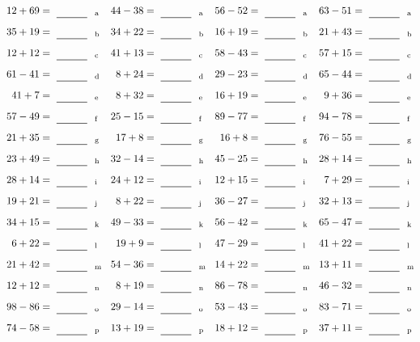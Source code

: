 \documentclass
[
  draft    = true,
  fontsize = 11pt,
  parskip  = half-
]
{scrartcl}
\begin{document}
\clearpage
\begin{align*}
    \pline{12+69}&=\rline{a}
  & \pline{44-38}&=\rline{a}
  & \pline{56-52}&=\rline{a}
  & \pline{63-51}&=\rline{a} \\[1ex]
    \pline{35+19}&=\rline{b}
  & \pline{34+22}&=\rline{b}
  & \pline{16+19}&=\rline{b}
  & \pline{21+43}&=\rline{b} \\[1ex]
    \pline{12+12}&=\rline{c}
  & \pline{41+13}&=\rline{c}
  & \pline{58-43}&=\rline{c}
  & \pline{57+15}&=\rline{c} \\[1ex]
    \pline{61-41}&=\rline{d}
  & \pline{8+24}&=\rline{d}
  & \pline{29-23}&=\rline{d}
  & \pline{65-44}&=\rline{d} \\[1ex]
    \pline{41+7}&=\rline{e}
  & \pline{8+32}&=\rline{e}
  & \pline{16+19}&=\rline{e}
  & \pline{9+36}&=\rline{e} \\[1ex]
    \pline{57-49}&=\rline{f}
  & \pline{25-15}&=\rline{f}
  & \pline{89-77}&=\rline{f}
  & \pline{94-78}&=\rline{f} \\[1ex]
    \pline{21+35}&=\rline{g}
  & \pline{17+8}&=\rline{g}
  & \pline{16+8}&=\rline{g}
  & \pline{76-55}&=\rline{g} \\[1ex]
    \pline{23+49}&=\rline{h}
  & \pline{32-14}&=\rline{h}
  & \pline{45-25}&=\rline{h}
  & \pline{28+14}&=\rline{h} \\[1ex]
    \pline{28+14}&=\rline{i}
  & \pline{24+12}&=\rline{i}
  & \pline{12+15}&=\rline{i}
  & \pline{7+29}&=\rline{i} \\[1ex]
    \pline{19+21}&=\rline{j}
  & \pline{8+22}&=\rline{j}
  & \pline{36-27}&=\rline{j}
  & \pline{32+13}&=\rline{j} \\[1ex]
    \pline{34+15}&=\rline{k}
  & \pline{49-33}&=\rline{k}
  & \pline{56-42}&=\rline{k}
  & \pline{65-47}&=\rline{k} \\[1ex]
    \pline{6+22}&=\rline{l}
  & \pline{19+9}&=\rline{l}
  & \pline{47-29}&=\rline{l}
  & \pline{41+22}&=\rline{l} \\[1ex]
    \pline{21+42}&=\rline{m}
  & \pline{54-36}&=\rline{m}
  & \pline{14+22}&=\rline{m}
  & \pline{13+11}&=\rline{m} \\[1ex]
    \pline{12+12}&=\rline{n}
  & \pline{8+19}&=\rline{n}
  & \pline{86-78}&=\rline{n}
  & \pline{46-32}&=\rline{n} \\[1ex]
    \pline{98-86}&=\rline{o}
  & \pline{29-14}&=\rline{o}
  & \pline{53-43}&=\rline{o}
  & \pline{83-71}&=\rline{o} \\[1ex]
    \pline{74-58}&=\rline{p}
  & \pline{13+19}&=\rline{p}
  & \pline{18+12}&=\rline{p}
  & \pline{37+11}&=\rline{p}
\end{align*}
\end{document}
